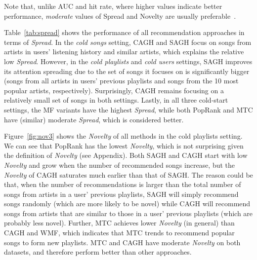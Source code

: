 Note that, unlike AUC and hit rate,
where higher values indicate better performance,
\emph{moderate} values of Spread and Novelty are usually preferable~\cite{kluver2014evaluating,schedl2017}.

Table~\ref{tab:spread} shows the performance of all recommendation approaches in terms of \emph{Spread}.
In the \emph{cold songs} setting, CAGH and SAGH focus on songs from artists in users' listening history and similar artists, 
which explains the relative low \emph{Spread}.
However, in the \emph{cold playlists} and \emph{cold users} settings, 
SAGH improves its attention spreading due to the set of songs it focuses on is significantly bigger 
(\ie songs from all artists in users' previous playlists and songs from the 10 most popular artists, respectively).
Surprisingly, CAGH remains focusing on a relatively small set of songs in both settings.
Lastly, in all three cold-start settings, the MF variants have the highest \emph{Spread},
while both PopRank and MTC have (similar) moderate \emph{Spread},
which is considered better. %




Figure~\ref{fig:nov3} shows the \emph{Novelty} of all methods in the cold playlists setting.
We can see that PopRank has the lowest \emph{Novelty},
which is not surprising given the definition of \emph{Novelty} (see Appendix).
Both SAGH and CAGH start with low \emph{Novelty} and grow when the number of recommended songs increase,
but the \emph{Novelty} of CAGH saturates much earlier than that of SAGH.
The reason could be that,
when the number of recommendations is larger than the total number of songs from artists in a user' previous playlists,
SAGH will simply recommend songs randomly (which are more likely to be novel)
while CAGH will recommend songs from artists that are similar to those in a user' previous playlists
(which are probably less novel).
Further, MTC achieves lower \emph{Novelty} (in general) than CAGH and WMF, 
which indicates that MTC trends to recommend popular songs to form new playlists. %
MTC and CAGH have moderate \emph{Novelty} on both datasets,
and therefore perform better than other approaches.


